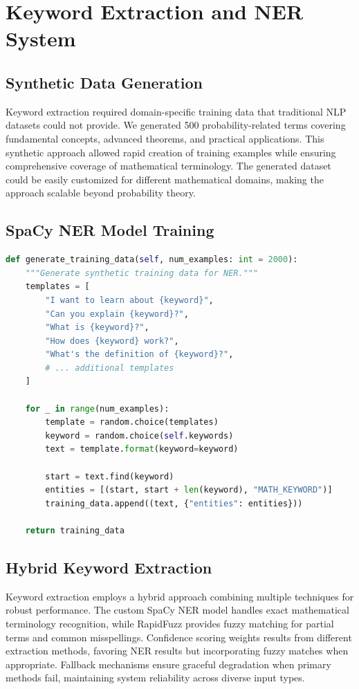 \documentclass[12pt]{article}
\begin{document}
\section{Keyword Extraction and NER System}

\subsection{Synthetic Data Generation}

Keyword extraction required domain-specific training data that traditional NLP datasets could not provide. We generated 500 probability-related terms covering fundamental concepts, advanced theorems, and practical applications. This synthetic approach allowed rapid creation of training examples while ensuring comprehensive coverage of mathematical terminology. The generated dataset could be easily customized for different mathematical domains, making the approach scalable beyond probability theory.

\subsection{SpaCy NER Model Training}

\begin{lstlisting}[language=Python, caption=NER Training Data Generation]
def generate_training_data(self, num_examples: int = 2000):
    """Generate synthetic training data for NER."""
    templates = [
        "I want to learn about {keyword}",
        "Can you explain {keyword}?",
        "What is {keyword}?",
        "How does {keyword} work?",
        "What's the definition of {keyword}?",
        # ... additional templates
    ]

    for _ in range(num_examples):
        template = random.choice(templates)
        keyword = random.choice(self.keywords)
        text = template.format(keyword=keyword)

        start = text.find(keyword)
        entities = [(start, start + len(keyword), "MATH_KEYWORD")]
        training_data.append((text, {"entities": entities}))

    return training_data
\end{lstlisting}

\subsection{Hybrid Keyword Extraction}

Keyword extraction employs a hybrid approach combining multiple techniques for robust performance. The custom SpaCy NER model handles exact mathematical terminology recognition, while RapidFuzz provides fuzzy matching for partial terms and common misspellings. Confidence scoring weights results from different extraction methods, favoring NER results but incorporating fuzzy matches when appropriate. Fallback mechanisms ensure graceful degradation when primary methods fail, maintaining system reliability across diverse input types.
\end{document}
